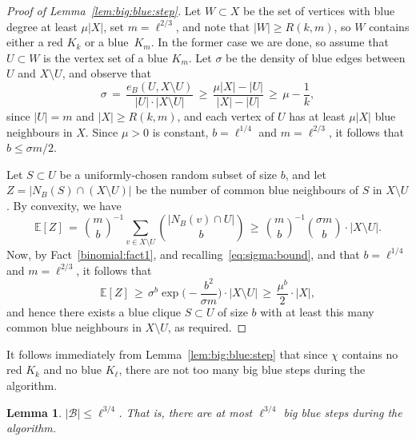 \documentclass[12pt,reqno]{amsart}
\newtheorem{lemma}[theorem]{Lemma}
\theoremstyle{definition}
\theoremstyle{remark}
\newcommand\cB{\mathcal{B}}
\newcommand\Ex{\mathbb{E}}
\renewcommand{\le}{\leqslant}
\renewcommand{\ge}{\geqslant}
\def\cB{\mathcal{B}}
\begin{document}
\begin{proof}[Proof of Lemma~\ref{lem:big:blue:step}]
Let $W \subset X$ be the set of vertices with blue degree at least $\mu |X|$, set $m = \ell^{2/3}$, and note that $|W| \ge R(k,m)$, so $W$ contains either a red $K_k$ or a blue~$K_m$. In the former case we are done, so assume that $U \subset W$ is the vertex set of a blue $K_m$. Let $\sigma$ be the density of blue edges between $U$ and $X \setminus U$, and observe that 
\begin{equation}\label{eq:sigma:bound}
\sigma \,=\, \frac{e_B(U,X \setminus U)}{|U| \cdot |X \setminus U|} \,\ge\, \frac{\mu |X| - |U|}{|X| - |U|} \,\ge\, \mu - \frac{1}{k},
\end{equation}
since $|U| = m$ and $|X| \ge R(k,m)$, and each vertex of $U$ has at least $\mu |X|$ blue neighbours in $X$. Since $\mu > 0$ is constant, $b = \ell^{1/4}$ and $m = \ell^{2/3}$, it follows that $b \le \sigma m / 2$. 

Let $S \subset U$ be a uniformly-chosen random subset of size $b$, and let $Z = |N_B(S) \cap (X \setminus U)|$ be the number of common blue neighbours of $S$ in $X \setminus U$. By convexity, we have
$$\Ex[Z] \,=\, {m \choose b}^{-1} \sum_{v \in X \setminus U} {|N_B(v) \cap U| \choose b} \,\ge\, {m \choose b}^{-1} {\sigma m \choose b} \cdot |X \setminus U|.$$
Now, by Fact~\ref{binomial:fact1}, and recalling~\eqref{eq:sigma:bound}, and that $b = \ell^{1/4}$ and $m = \ell^{2/3}$, it follows that
\begin{equation}\label{eq:bigblue:ExZ:convexity}
\Ex[Z] \,\ge\, \sigma^b \exp\bigg( - \frac{b^2}{\sigma m} \bigg) \cdot |X \setminus U| \,\ge\, \frac{\mu^b}{2} \cdot |X|,
\end{equation}
and hence there exists a blue clique $S \subset U$ of size $b$ with at least this many common blue neighbours in $X \setminus U$, as required.
\end{proof}

It follows immediately from Lemma~\ref{lem:big:blue:step} that since $\chi$ contains no red $K_k$ and no blue $K_\ell$, there are not too many big blue steps during the algorithm. 

\begin{lemma}\label{lem:few:big:blue}
$|\cB| \le \ell^{3/4}$. That is, there are at most $\ell^{3/4}$ big blue steps during the algorithm.
\end{lemma}
\end{document}
